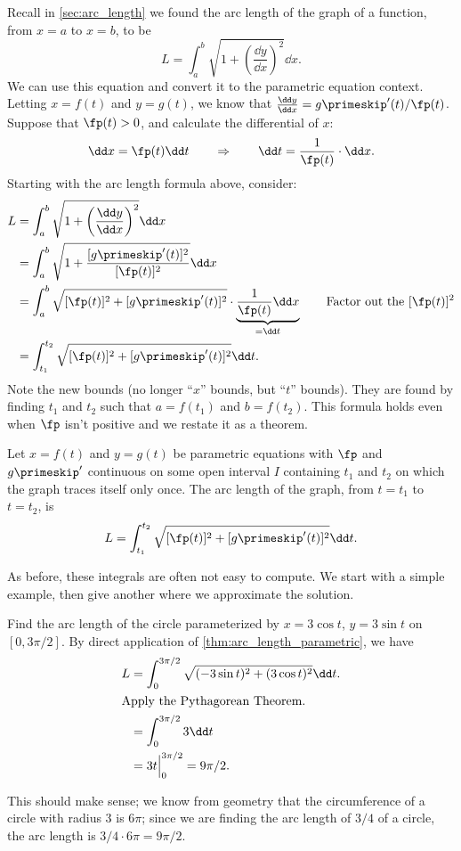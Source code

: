 Recall in \autoref{sec:arc_length} we found the arc length of the graph of a function, from $x=a$ to $x=b$, to be
\[L = \int_a^b\sqrt{1+\left(\frac{\dd y}{\dd x}\right)^2}\dd x.\]
We can use this equation and convert it to the parametric equation context. Letting $x=f(t)$ and $y=g(t)$, we know that $\frac{\dd y}{\dd x} = g\primeskip'(t)/\fp(t)$. Suppose that $\fp(t)>0$, and calculate the differential of $x$:
\[\dd x = \fp(t)\dd t \qquad \Rightarrow \qquad \dd t = \frac{1}{\fp(t)}\cdot \dd x.\]
Starting with the arc length formula above, consider:
\begin{align*}
	L &= \int_a^b\sqrt{1+\left(\frac{\dd y}{\dd x}\right)^2}\dd x\\
	&= \int_a^b \sqrt{1+\frac{[g\primeskip'(t)]^2}{[\fp(t)]^2}}\dd x \\
	&= \int_a^b \sqrt{[\fp(t)]^2+[g\primeskip'(t)]^2}\cdot\underbrace{\frac1{\fp(t)}\dd x}_{=\dd t} \qquad\text{Factor out the $[\fp(t)]^2$} \\
	&= \int_{t_1}^{t_2} \sqrt{[\fp(t)]^2+[g\primeskip'(t)]^2}\dd t.\\
\end{align*}
Note the new bounds (no longer ``$x$'' bounds, but ``$t$'' bounds). They are found by finding $t_1$ and $t_2$ such that $a= f(t_1)$ and $b=f(t_2)$. This formula holds even when $\fp$ isn't positive and we restate it as a theorem.

\begin{theorem}\label{thm:arc_length_parametric}
Let $x=f(t)$ and $y=g(t)$ be parametric equations with $\fp$ and $g\primeskip'$ continuous on some open interval $I$ containing $t_1$ and $t_2$ on which the graph traces itself only once. The arc length of the graph, from $t=t_1$ to $t=t_2$, is
\[L = \int_{t_1}^{t_2} \sqrt{[\fp(t)]^2+[g\primeskip'(t)]^2}\dd t.\]
\end{theorem}

As before, these integrals are often not easy to compute. We start with a simple example, then give  another where we approximate the solution.

\begin{example}\label{ex_parcalc6}
Find the arc length of the circle parameterized by $x=3\cos t$, $y=3\sin t$ on $[0,3\pi/2]$. 
\solution
By direct application of \autoref{thm:arc_length_parametric}, we have
\begin{align*}
L &= \int_0^{3\pi/2} \sqrt{(-3\sin t)^2 +(3\cos t)^2} \dd t.\\
\intertext{Apply the Pythagorean Theorem.}
	&= \int_0^{3\pi/2} 3 \dd t\\
	&= 3t\Big|_0^{3\pi/2} = 9\pi/2.
	\end{align*}
	
This should make sense; we know from geometry that the circumference of a circle with radius 3 is $6\pi$; since we are finding the arc length of $3/4$ of a circle, the arc length is $3/4\cdot 6\pi = 9\pi/2$.
\end{example}

